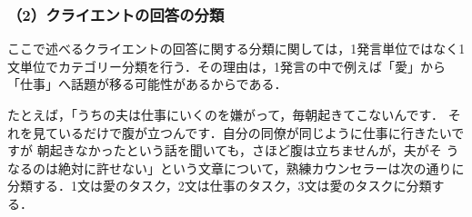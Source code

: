 \documentclass[shuuron]{kuee}
\begin{document}







\subsubsection{（2）クライエントの回答の分類}



ここで述べるクライエントの回答に関する分類に関しては，1発言単位ではなく1文単位でカテゴリー分類を行う．その理由は，1発言の中で例えば「愛」から「仕事」へ話題が移る可能性があるからである．

たとえば，「うちの夫は仕事にいくのを嫌がって，毎朝起きてこないんです．
それを見ているだけで腹が立つんです．自分の同僚が同じように仕事に行きたいですが
朝起きなかったという話を聞いても，さほど腹は立ちませんが，夫がそ
うなるのは絶対に許せない」という文章について，熟練カウンセラーは次の通りに分類する．1文は愛のタスク，2文は仕事のタスク，3文は愛のタスクに分類する．%

\end{document}
